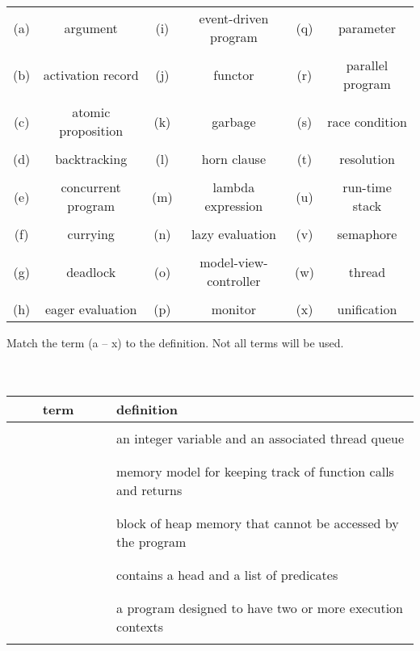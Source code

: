 \documentclass[addpoints]{exam}
\begin{document}
\begin{questions}

 \newpage

\begin{center}
\begin{tabular}{|c|c||c|c||c|c|}
\hline 
(a) & argument & (i) & event-driven program & (q) & parameter\tabularnewline
 &  &  &  &  & \tabularnewline
(b) & activation record & (j) & functor & (r) & parallel program\tabularnewline
 &  &  &  &  & \tabularnewline
(c) & atomic proposition & (k) & garbage & (s) & race condition\tabularnewline
 &  &  &  &  & \tabularnewline
(d) & backtracking & (l) & horn clause & (t) & resolution\tabularnewline
 &  &  &  &  & \tabularnewline
(e) & concurrent program & (m) & lambda expression & (u) & run-time stack\tabularnewline
 &  &  &  &  & \tabularnewline
(f) & currying & (n) & lazy evaluation & (v) & semaphore\tabularnewline
 &  &  &  &  & \tabularnewline
(g) & deadlock & (o) & model-view-controller & (w) & thread\tabularnewline
 &  &  &  &  & \tabularnewline
(h) & eager evaluation & (p) & monitor & (x) & unification\tabularnewline
\hline 
\end{tabular}
\end{center}
\vspace{3em}
 
 \question[15]
 Match the term (a -- x) to the definition. Not all terms will be used.
 \\\\\\
 \begin{center}
 \begin{tabular}{|c|l|}
\hline 
~~~~term~~~~ & definition\tabularnewline
\hline 
 & \tabularnewline
 & an integer variable and an associated thread queue\tabularnewline
 & \tabularnewline
\hline 
 & \tabularnewline
 & memory model for keeping track of function calls and returns\tabularnewline
 & \tabularnewline
\hline 
 & \tabularnewline
 & block of heap memory that cannot be accessed by the program\tabularnewline
 & \tabularnewline
\hline 
 & \tabularnewline
 & contains a head and a list of predicates\tabularnewline
 & \tabularnewline
\hline 
 & \tabularnewline
 & a program designed to have two or more execution contexts\tabularnewline
 & \tabularnewline
\hline 
\end{tabular}
\end{center}


\end{questions}
\end{document}
